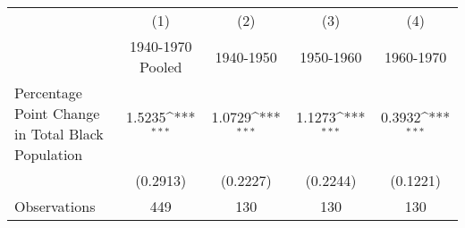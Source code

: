 {
\def\sym#1{\ifmmode^{#1}\else\(^{#1}\)\fi}
\begin{tabular}{l*{4}{c}}
\hline\hline
                    &\multicolumn{1}{c}{(1)}&\multicolumn{1}{c}{(2)}&\multicolumn{1}{c}{(3)}&\multicolumn{1}{c}{(4)}\\
                    &\multicolumn{1}{c}{1940-1970 Pooled}&\multicolumn{1}{c}{1940-1950}&\multicolumn{1}{c}{1950-1960}&\multicolumn{1}{c}{1960-1970}\\
\hline
Percentage Point Change in Total Black Population&      1.5235\sym{***}&      1.0729\sym{***}&      1.1273\sym{***}&      0.3932\sym{***}\\
                    &    (0.2913)         &    (0.2227)         &    (0.2244)         &    (0.1221)         \\
\hline
Observations        &         449         &         130         &         130         &         130         \\
\hline\hline
\end{tabular}
}
